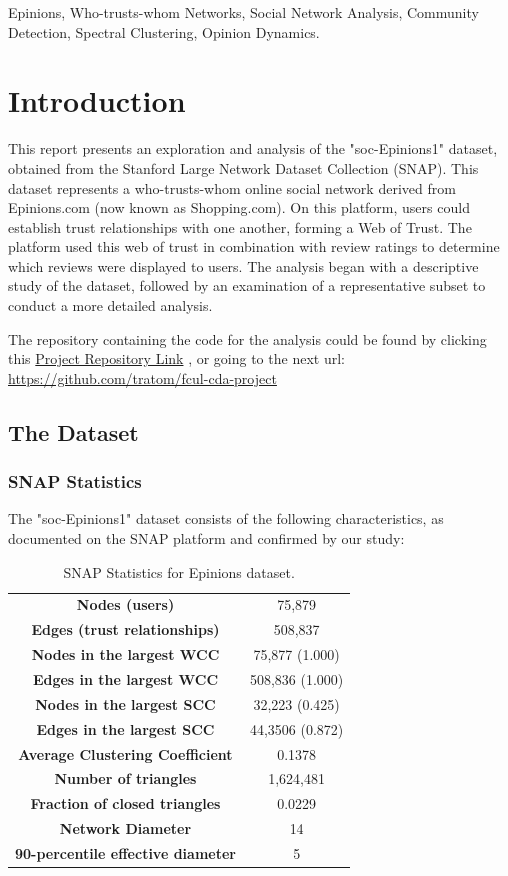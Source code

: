 \documentclass[conference]{IEEEtran}
\begin{document}
\begin{IEEEkeywords}
Epinions,
Who-trusts-whom Networks,
Social Network Analysis,
Community Detection,
Spectral Clustering,
Opinion Dynamics.
\end{IEEEkeywords}

\section{Introduction}
This report presents an exploration and analysis of the "soc-Epinions1" dataset, obtained from the Stanford Large Network Dataset Collection (SNAP). This dataset represents  a who-trusts-whom online social network derived from Epinions.com (now known as Shopping.com). On this platform, users could establish trust relationships with one another, forming a Web of Trust. The platform used this web of trust in combination with review ratings to determine which reviews were displayed to users.
The analysis began with a descriptive study of the dataset, followed by an examination of a representative subset to conduct a more detailed analysis. 

The repository containing the code for the analysis could be found by clicking this
\href{https://github.com/tratom/fcul-cda-project}{Project Repository Link} ,
or going to the next url: \url{https://github.com/tratom/fcul-cda-project}

\subsection{The Dataset}
\subsubsection{SNAP Statistics}
The "soc-Epinions1" dataset consists of the following characteristics, as documented on the SNAP platform and confirmed by our study:

\begin{table}[h!]
\centering
\begin{tabular}{|c|c|}
\toprule
\textbf{Nodes (users)} & 75,879 \\
\textbf{Edges (trust relationships)} & 508,837 \\
\textbf{Nodes in the largest WCC} & 75,877 (1.000) \\
\textbf{Edges in the largest WCC} & 508,836 (1.000) \\
\textbf{Nodes in the largest SCC} & 32,223 (0.425) \\
\textbf{Edges in the largest SCC} & 44,3506 (0.872) \\
\textbf{Average Clustering Coefficient} & 0.1378 \\
\textbf{Number of triangles} & 1,624,481 \\
\textbf{Fraction of closed triangles} & 0.0229 \\
\textbf{Network Diameter} & 14 \\
\textbf{90-percentile effective diameter} & 5\\
\bottomrule
\end{tabular}
\caption{SNAP Statistics for Epinions dataset.}
\label{tab:network_stats}
\end{table}
\end{document}
